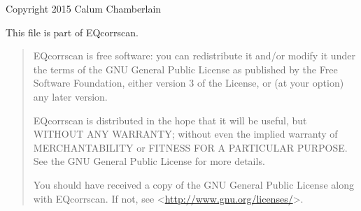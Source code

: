 \documentclass[a4paper,10pt,english]{sphinxmanual}
\begin{document}
Copyright 2015 Calum Chamberlain

This file is part of EQcorrscan.
\begin{quote}

EQcorrscan is free software: you can redistribute it and/or modify
it under the terms of the GNU General Public License as published by
the Free Software Foundation, either version 3 of the License, or
(at your option) any later version.

EQcorrscan is distributed in the hope that it will be useful,
but WITHOUT ANY WARRANTY; without even the implied warranty of
MERCHANTABILITY or FITNESS FOR A PARTICULAR PURPOSE.  See the
GNU General Public License for more details.

You should have received a copy of the GNU General Public License
along with EQcorrscan.  If not, see \textless{}\href{http://www.gnu.org/licenses/}{http://www.gnu.org/licenses/}\textgreater{}.
\end{quote}
\end{document}
